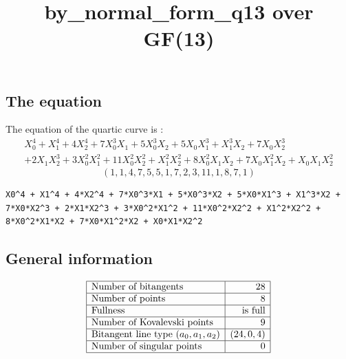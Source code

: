 \documentclass{article}
\newcommand\setTBstruts{\def\T{\rule{0pt}{2.6ex}}%
\def\B{\rule[-1.2ex]{0pt}{0pt}}}
\begin{document}
 
\setTBstruts



{\allowdisplaybreaks%






\title{by\_normal\_form\_q13 over GF(13)}
\author{}%
\maketitle%
%



\subsection*{The equation}
The equation of the quartic curve  is :
$$
\begin{array}{c}
X_0^4 + X_1^4 + 4X_2^4 + 7X_0^3X_1 + 5X_0^3X_2 + 5X_0X_1^3 + X_1^3X_2 + 7X_0X_2^3\\
 + 2X_1X_2^3 + 3X_0^2X_1^2 + 11X_0^2X_2^2 + X_1^2X_2^2 + 8X_0^2X_1X_2 + 7X_0X_1^2X_2 + X_0X_1X_2^2\end{array}
$$
$$
( 1, 1, 4, 7, 5, 5, 1, 7, 2, 3, 11, 1, 8, 7, 1 )$$
\begin{verbatim}
X0^4 + X1^4 + 4*X2^4 + 7*X0^3*X1 + 5*X0^3*X2 + 5*X0*X1^3 + X1^3*X2 + 7*X0*X2^3 + 2*X1*X2^3 + 3*X0^2*X1^2 + 11*X0^2*X2^2 + X1^2*X2^2 + 8*X0^2*X1*X2 + 7*X0*X1^2*X2 + X0*X1*X2^2
\end{verbatim}
\subsection*{General information}
{\renewcommand{\arraystretch}{1.5}
$$
\begin{array}{|l|r|}
\hline
\mbox{Number of bitangents} & 28\\
\hline
\mbox{Number of points} & 8\\
\hline
\mbox{Fullness} &  \mbox{is full}\\
\hline
\mbox{Number of Kovalevski points} & 9\\
\hline
\mbox{Bitangent line type $(a_0,a_1,a_2)$} & (24,
0,
4)\\
\hline
\mbox{Number of singular points} & 0\\
\hline
\end{array}
$$}
}
\end{document}
